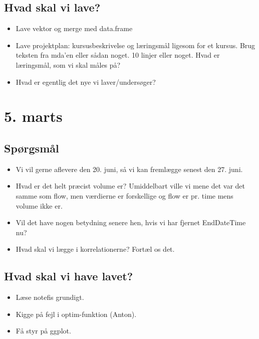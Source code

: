 \subsection{Hvad skal vi lave?}
\begin{itemize} 
    \item Lave vektor og merge med data.frame
    \item Lave projektplan: kursusbeskrivelse og læringsmål ligesom for et kursus. Brug teksten fra mda'en eller sådan noget. 10 linjer eller noget. Hvad er læringsmål, som vi skal måles på? 
    \item Hvad er egentlig det nye vi laver/undersøger?
\end{itemize}

\pagebreak

\section{5. marts}

\subsection{Spørgsmål}
\begin{itemize}
    \item Vi vil gerne aflevere den 20. juni, så vi kan fremlægge senest den 27. juni. 
    \item Hvad er det helt præcist volume er? Umiddelbart ville vi mene det var det samme som flow, men værdierne er forskellige og flow er pr. time mens volume ikke er.
    \item Vil det have nogen betydning senere hen, hvis vi har fjernet EndDateTime nu?
    \item Hvad skal vi lægge i korrelationerne? Fortæl os det.
\end{itemize}

\subsection{Hvad skal vi have lavet?}
\begin{itemize}
    \item Læse notefis grundigt. 
    \item Kigge på fejl i optim-funktion (Anton).
    \item Få styr på ggplot. 
\end{itemize}

